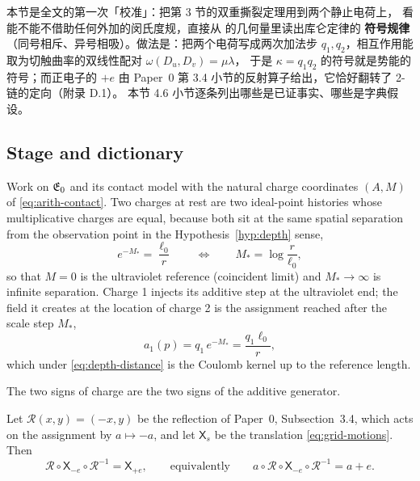 
\begin{cnread}
本节是全文的第一次「校准」：把第 3 节的双重撕裂定理用到两个静止电荷上，
看能不能不借助任何外加的闵氏度规，直接从 \AEG{} 的几何量里读出库仑定律的
\textbf{符号规律}（同号相斥、异号相吸）。做法是：把两个电荷写成两次加法步
$q_1,q_2$，相互作用能取为切触曲率的双线性配对 $\omega(D_u,D_v)=\mu\lambda$，
于是 $\kappa=q_1q_2$ 的符号就是势能的符号；而正电子的 $+e$ 由 Paper~0
第 3.4 小节的反射算子给出，它恰好翻转了 2-链的定向（附录 D.1）。
本节 4.6 小节逐条列出哪些是已证事实、哪些是字典假设。
\end{cnread}

\subsection{Stage and dictionary}

Work on $\mathfrak{E}_0$ and its contact model with the natural charge coordinates
$(A,M)$ of \eqref{eq:arith-contact}.  Two charges at rest are two ideal-point
histories whose multiplicative charges are equal, because both sit at the same
spatial separation from the observation point in the
Hypothesis~\ref{hyp:depth} sense,
\begin{equation}\label{eq:depth-distance}
  e^{-M_*}=\frac{\ell_0}{r}
  \qquad\Longleftrightarrow\qquad
  M_*=\log\frac{r}{\ell_0},
\end{equation}
so that $M=0$ is the ultraviolet reference (coincident limit) and $M_*\to\infty$
is infinite separation.  Charge 1 injects its additive step at the ultraviolet
end; the field it creates at the location of charge 2 is the assignment reached
after the scale step $M_*$,
\begin{equation}\label{eq:field-at-2}
  a_1(p)=q_1\,e^{-M_*}=\frac{q_1\ell_0}{r},
\end{equation}
which under \eqref{eq:depth-distance} is the Coulomb kernel up to the reference
length.

The two signs of charge are the two signs of the additive generator.

\begin{lemma}
\label{lem:reflection}
Let $\mathcal R(x,y)=(-x,y)$ be the reflection of Paper~0, Subsection~3.4, which
acts on the assignment by $a\mapsto-a$, and let $\mathsf X_s$ be the
translation \eqref{eq:grid-motions}.  Then
\[
  \mathcal R\circ\mathsf X_{-e}\circ\mathcal R^{-1}=\mathsf X_{+e},
  \qquad\text{equivalently}\qquad
  a\circ\mathcal R\circ\mathsf X_{-e}\circ\mathcal R^{-1}=a+e .
\]
\end{lemma}

